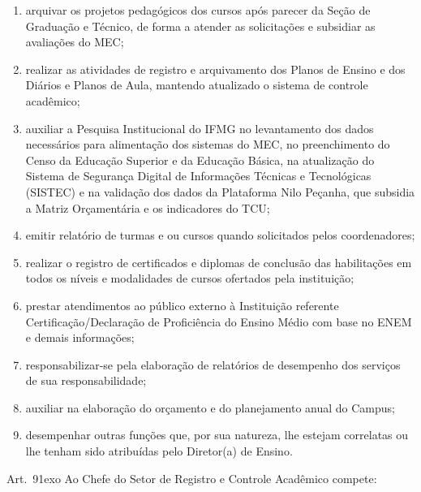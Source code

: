\documentclass[a4paper,12pt]{report}
\newcommand{\ORD}[2]{#1\raise1ex\hbox{\scriptsize#2}}
\begin{document}
\begin{enumerate}
\item arquivar os projetos pedagógicos dos cursos após parecer da Seção de Graduação e 
      Técnico, de forma a atender as solicitações e subsidiar as avaliações do MEC;

\item realizar as atividades de registro e arquivamento dos Planos de Ensino e dos Diários 
      e Planos de Aula, mantendo atualizado o sistema de controle acadêmico;

\item auxiliar a Pesquisa Institucional do IFMG no levantamento dos dados necessários para 
      alimentação dos sistemas do MEC, no preenchimento do Censo da Educação Superior e 
      da Educação Básica, na atualização do Sistema de Segurança Digital de Informações 
      Técnicas e Tecnológicas (SISTEC) e na validação dos dados da Plataforma Nilo Peçanha, 
      que subsidia a Matriz Orçamentária e os indicadores do TCU;

\item emitir relatório de turmas e ou cursos quando solicitados pelos coordenadores;

\item realizar o registro de certificados e diplomas de conclusão das habilitações em todos 
      os níveis e modalidades de cursos ofertados pela instituição;

\item prestar atendimentos ao público externo à Instituição referente 
      Certificação/Declaração de Proficiência do Ensino Médio com base no ENEM e demais 
      informações;

\item responsabilizar-se pela elaboração de relatórios de desempenho dos serviços de sua   
      responsabilidade;

\item auxiliar na elaboração do orçamento e do planejamento anual do Campus;

\item desempenhar outras funções que, por sua natureza, lhe estejam correlatas ou lhe   
      tenham sido atribuídas pelo Diretor(a) de Ensino.
\end{enumerate}


Art.~\ORD{9}{o} Ao Chefe do Setor de Registro e Controle Acadêmico compete:
\end{document}
